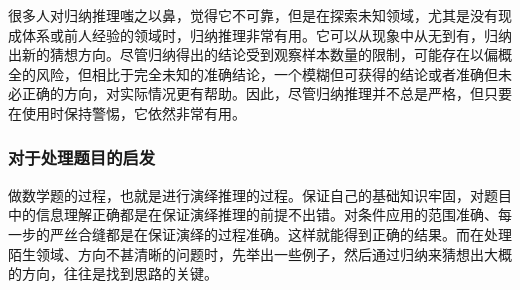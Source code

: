 很多人对归纳推理嗤之以鼻，觉得它不可靠，但是在探索未知领域，尤其是没有现成体系或前人经验的领域时，归纳推理非常有用。它可以从现象中从无到有，归纳出新的猜想方向。尽管归纳得出的结论受到观察样本数量的限制，可能存在以偏概全的风险，但相比于完全未知的准确结论，一个模糊但可获得的结论或者准确但未必正确的方向，对实际情况更有帮助。因此，尽管归纳推理并不总是严格，但只要在使用时保持警惕，它依然非常有用。

\subsubsection{对于处理题目的启发}

做数学题的过程，也就是进行演绎推理的过程。保证自己的基础知识牢固，对题目中的信息理解正确都是在保证演绎推理的前提不出错。对条件应用的范围准确、每一步的严丝合缝都是在保证演绎的过程准确。这样就能得到正确的结果。而在处理陌生领域、方向不甚清晰的问题时，先举出一些例子，然后通过归纳来猜想出大概的方向，往往是找到思路的关键。
